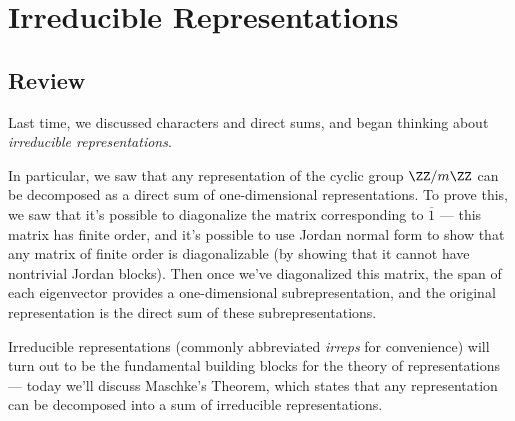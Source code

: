 


\section{Irreducible Representations}

\subsection{Review}

Last time, we discussed characters and direct sums, and began thinking about \emph{irreducible representations}. 

In particular, we saw that any representation of the cyclic group $\ZZ/m\ZZ$ can be decomposed as a direct sum of one-dimensional representations. To prove this, we saw that it's possible to diagonalize the matrix corresponding to $\overline{1}$ --- this matrix has finite order, and it's possible to use Jordan normal form to show that any matrix of finite order is diagonalizable (by showing that it cannot have nontrivial Jordan blocks). Then once we've diagonalized this matrix, the span of each eigenvector provides a one-dimensional subrepresentation, and the original representation is the direct sum of these subrepresentations. 


Irreducible representations (commonly abbreviated \emph{irreps} for convenience) will turn out to be the fundamental building blocks for the theory of representations --- today we'll discuss Maschke's Theorem, which states that any representation can be decomposed into a sum of irreducible representations. 


